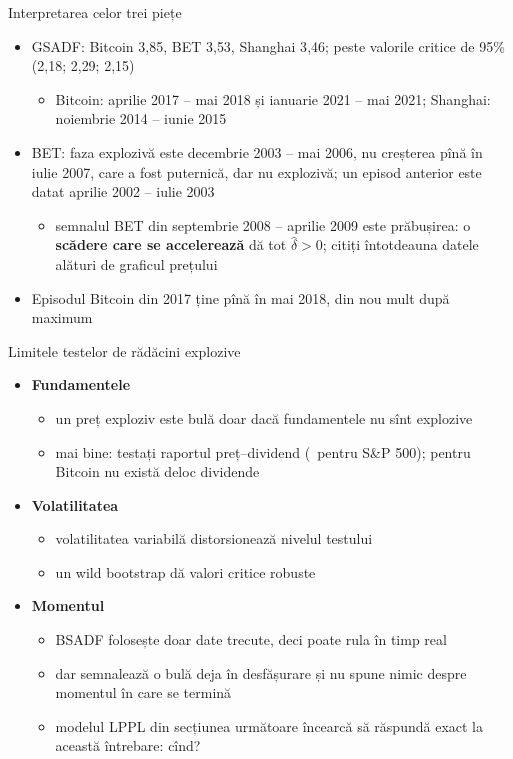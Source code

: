 \begin{frame}{Interpretarea celor trei piețe}
\itemsize{\small}
\begin{itemize}
    \item GSADF: Bitcoin 3{,}85, BET 3{,}53, Shanghai 3{,}46; peste valorile critice de 95\% (2{,}18; 2{,}29; 2{,}15)
    \begin{itemize}
        \item Bitcoin: aprilie 2017 -- mai 2018 și ianuarie 2021 -- mai 2021; Shanghai: noiembrie 2014 -- iunie 2015
    \end{itemize}
    \item BET: faza explozivă este decembrie 2003 -- mai 2006, nu creșterea pînă în iulie 2007, care a fost puternică, dar nu explozivă; un episod anterior este datat aprilie 2002 -- iulie 2003
    \begin{itemize}
        \item semnalul BET din septembrie 2008 -- aprilie 2009 este prăbușirea: o \textbf{scădere care se accelerează} dă tot $\hat\delta > 0$; citiți întotdeauna datele alături de graficul prețului
    \end{itemize}
    \item Episodul Bitcoin din 2017 ține pînă în mai 2018, din nou mult după maximum
\end{itemize}
\end{frame}

\begin{frame}{Limitele testelor de rădăcini explozive}
\itemsize{\small}
\begin{itemize}
    \item \textbf{Fundamentele}
    \begin{itemize}
        \item un preț exploziv este bulă doar dacă fundamentele nu sînt explozive
        \item mai bine: testați raportul preț--dividend (\ pentru S\&P 500); pentru Bitcoin nu există deloc dividende
    \end{itemize}
    \item \textbf{Volatilitatea}
    \begin{itemize}
        \item volatilitatea variabilă distorsionează nivelul testului
        \item un wild bootstrap dă valori critice robuste 
    \end{itemize}
    \item \textbf{Momentul}
    \begin{itemize}
        \item BSADF folosește doar date trecute, deci poate rula în timp real
        \item dar semnalează o bulă deja în desfășurare și nu spune nimic despre momentul în care se termină
        \item modelul LPPL din secțiunea următoare încearcă să răspundă exact la această întrebare: cînd?
    \end{itemize}
\end{itemize}
\end{frame}

